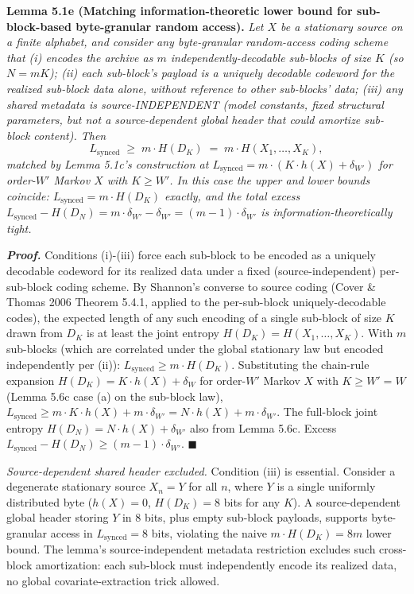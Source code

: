 \documentclass[
]{article}
\begin{document}
\textbf{Lemma 5.1e (Matching information-theoretic lower bound for
sub-block-based byte-granular random access).} \emph{Let $X$ be a
stationary source on a finite alphabet, and consider any byte-granular
random-access coding scheme that (i) encodes the archive as $m$
independently-decodable sub-blocks of size $K$ (so $N = mK$); (ii)
each sub-block's payload is a uniquely decodable codeword for the
realized sub-block data alone, without reference to other sub-blocks'
data; (iii) any shared metadata is source-INDEPENDENT (model constants,
fixed structural parameters, but \emph{not} a source-dependent global
header that could amortize sub-block content). Then}
\[
L_{\mathrm{synced}} \;\geq\; m \cdot H(D_K) \;=\; m \cdot H(X_1, \ldots, X_K),
\]
\emph{matched by Lemma 5.1c's construction at $L_{\mathrm{synced}} =
m \cdot (K \cdot h(X) + \delta_{W'})$ for order-$W'$ Markov $X$ with
$K \geq W'$. In this case the upper and lower bounds coincide:
$L_{\mathrm{synced}} = m \cdot H(D_K)$ exactly, and the total excess
$L_{\mathrm{synced}} - H(D_N) = m \cdot \delta_{W'} - \delta_{W'} =
(m-1) \cdot \delta_{W'}$ is information-theoretically tight.}

\emph{\textbf{Proof.}} Conditions (i)-(iii) force each sub-block to
be encoded as a uniquely decodable codeword for its realized data
under a fixed (source-independent) per-sub-block coding scheme. By
Shannon's converse to source coding (Cover \& Thomas 2006 Theorem
5.4.1, applied to the per-sub-block uniquely-decodable codes), the
expected length of any such encoding of a single sub-block of size
$K$ drawn from $D_K$ is at least the joint entropy $H(D_K) =
H(X_1, \ldots, X_K)$. With $m$ sub-blocks (which are correlated under
the global stationary law but encoded independently per (ii)):
$L_{\mathrm{synced}} \geq m \cdot H(D_K)$. Substituting the chain-rule
expansion $H(D_K) = K \cdot h(X) + \delta_W$ for order-$W'$ Markov
$X$ with $K \geq W' = W$ (Lemma 5.6c case (a) on the sub-block law),
$L_{\mathrm{synced}} \geq m \cdot K \cdot h(X) + m \cdot \delta_{W'}
= N \cdot h(X) + m \cdot \delta_{W'}$. The full-block joint entropy
$H(D_N) = N \cdot h(X) + \delta_{W'}$ also from Lemma 5.6c. Excess
$L_{\mathrm{synced}} - H(D_N) \geq (m - 1) \cdot \delta_{W'}$.
\hfill$\blacksquare$

\emph{Source-dependent shared header excluded.} Condition (iii) is
essential. Consider a degenerate stationary source $X_n = Y$ for all
$n$, where $Y$ is a single uniformly distributed byte ($h(X) = 0$,
$H(D_K) = 8$ bits for any $K$). A source-dependent global header
storing $Y$ in $8$ bits, plus empty sub-block payloads, supports
byte-granular access in $L_{\mathrm{synced}} = 8$ bits, violating the
naive $m \cdot H(D_K) = 8m$ lower bound. The lemma's source-independent
metadata restriction excludes such cross-block amortization: each
sub-block must independently encode its realized data, no global
covariate-extraction trick allowed.
\end{document}
